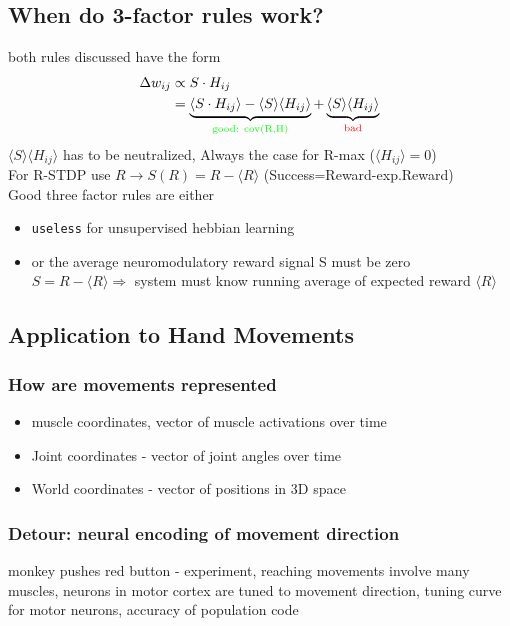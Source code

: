\documentclass[11pt]{article}
\begin{document}
\subsection{When do 3-factor rules work?}
both rules discussed have the form 
\begin{align*}
\Delta w_{ij} &\propto S \cdot H_{ij}\\
&=\underbrace{\langle S\cdot H_{ij}\rangle - \langle S \rangle \langle H_{ij} \rangle}_{\text{\textcolor{green}{good: cov(R,H)}}} + \underbrace{\langle S \rangle \langle H_{ij} \rangle}_{\text{\textcolor{red}{bad}}}
\end{align*}
$\langle S \rangle \langle H_{ij} \rangle$ has to be neutralized, Always the case for R-max ($\langle H_{ij} \rangle=0$)\\
For R-STDP use $R \rightarrow S(R)=R-\langle R \rangle$ (Success=Reward-exp.Reward)\\
Good three factor rules are either 
\begin{itemize}
\item \texttt{useless} for unsupervised hebbian learning
\item or the average neuromodulatory reward signal S must be zero $S = R - \langle R \rangle \Rightarrow$ system must know running average of expected reward $\langle R \rangle$
\end{itemize}

\subsection{Application to Hand Movements}
\subsubsection{How are movements represented}
\begin{itemize}
\item muscle coordinates, vector of muscle activations over time
\item Joint coordinates - vector of joint angles over time
\item World coordinates - vector of positions in 3D space
\end{itemize}

\subsubsection{Detour: neural encoding of movement direction}
monkey pushes red button - experiment, reaching movements involve many muscles, neurons in motor cortex are tuned to movement direction, tuning curve for motor neurons, accuracy of population code
\end{document}
